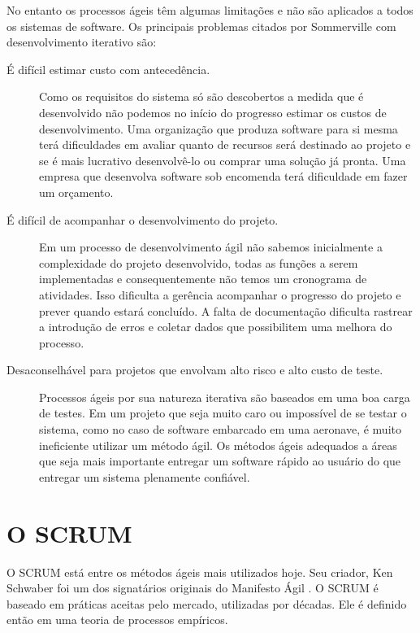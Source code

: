 No entanto os processos ágeis têm algumas limitações e não são aplicados a todos os sistemas de software. Os principais problemas citados por Sommerville \cite{Sommerville2007} com desenvolvimento iterativo são:	

\begin{description}
\item[É difícil estimar custo com antecedência.] Como os requisitos do sistema só são descobertos a medida que é desenvolvido não podemos no início do progresso estimar os custos de desenvolvimento. Uma organização que produza software para si mesma terá dificuldades em avaliar quanto de recursos será destinado ao projeto e se é  mais lucrativo desenvolvê-lo ou comprar uma solução já pronta. Uma empresa que desenvolva software sob encomenda terá dificuldade em fazer um orçamento.

\item[É difícil de acompanhar o desenvolvimento do projeto.] Em um processo de desenvolvimento ágil não sabemos inicialmente a complexidade do projeto desenvolvido, todas as funções a serem implementadas e consequentemente não temos um cronograma de atividades. Isso dificulta a gerência acompanhar o progresso do projeto e prever quando estará concluído. A falta de documentação dificulta rastrear a introdução de erros e coletar dados que possibilitem uma melhora do processo.

\item[Desaconselhável para projetos que envolvam alto risco e alto custo de teste.] \newline

Processos ágeis por sua natureza iterativa são baseados em uma boa carga de testes. Em um projeto que seja muito caro ou impossível de se testar o sistema, como no caso de software embarcado em uma aeronave,  é muito ineficiente utilizar um método ágil.  Os métodos ágeis adequados a áreas que seja mais importante entregar um software rápido ao usuário do que entregar um sistema plenamente confiável.
\end{description}

\section{O SCRUM}

O SCRUM está entre os métodos ágeis mais utilizados hoje. Seu criador, Ken Schwaber foi um dos signatários originais do Manifesto Ágil \cite{agilemanifesto2001}. O SCRUM é baseado em práticas aceitas pelo mercado, utilizadas por décadas. Ele é definido então em uma teoria de processos empíricos.

